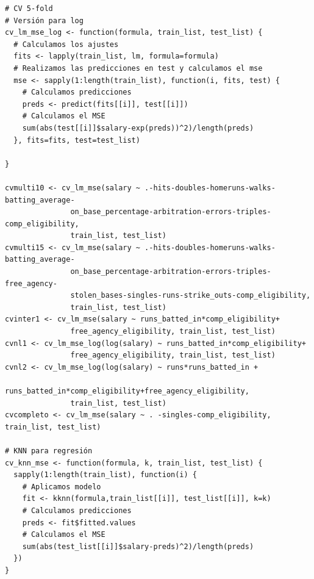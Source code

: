 \documentclass[a4paper,12pt, oneside]{book}
\begin{document}
\begin{verbatim}
# CV 5-fold
# Versión para log
cv_lm_mse_log <- function(formula, train_list, test_list) {
  # Calculamos los ajustes
  fits <- lapply(train_list, lm, formula=formula)
  # Realizamos las predicciones en test y calculamos el mse
  mse <- sapply(1:length(train_list), function(i, fits, test) {
    # Calculamos predicciones
    preds <- predict(fits[[i]], test[[i]])
    # Calculamos el MSE
    sum(abs(test[[i]]$salary-exp(preds))^2)/length(preds)
  }, fits=fits, test=test_list)
  
}

cvmulti10 <- cv_lm_mse(salary ~ .-hits-doubles-homeruns-walks-batting_average-
	           on_base_percentage-arbitration-errors-triples-comp_eligibility, 
	           train_list, test_list)
cvmulti15 <- cv_lm_mse(salary ~ .-hits-doubles-homeruns-walks-batting_average-
	           on_base_percentage-arbitration-errors-triples-free_agency-
	           stolen_bases-singles-runs-strike_outs-comp_eligibility, 
	           train_list, test_list)
cvinter1 <- cv_lm_mse(salary ~ runs_batted_in*comp_eligibility+
	           free_agency_eligibility, train_list, test_list)
cvnl1 <- cv_lm_mse_log(log(salary) ~ runs_batted_in*comp_eligibility+
	           free_agency_eligibility, train_list, test_list)
cvnl2 <- cv_lm_mse_log(log(salary) ~ runs*runs_batted_in + 
	           runs_batted_in*comp_eligibility+free_agency_eligibility, 
	           train_list, test_list)
cvcompleto <- cv_lm_mse(salary ~ . -singles-comp_eligibility, train_list, test_list)

# KNN para regresión
cv_knn_mse <- function(formula, k, train_list, test_list) {
  sapply(1:length(train_list), function(i) {
    # Aplicamos modelo
    fit <- kknn(formula,train_list[[i]], test_list[[i]], k=k)
    # Calculamos predicciones
    preds <- fit$fitted.values
    # Calculamos el MSE
    sum(abs(test_list[[i]]$salary-preds)^2)/length(preds)
  })
}


\end{verbatim}
\end{document}
